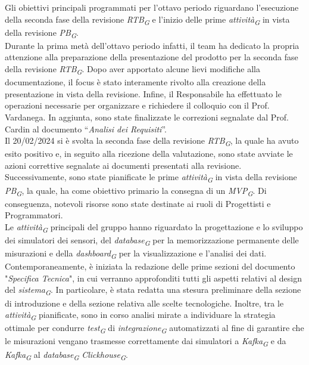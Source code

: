 Gli obiettivi principali programmati per l’ottavo periodo riguardano l’esecuzione della seconda fase della revisione \textit{RTB}\textsubscript{\textit{G}} e l’inizio delle prime \textit{attività}\textsubscript{\textit{G}} in vista della revisione \textit{PB}\textsubscript{\textit{G}}. \\
Durante la prima metà dell’ottavo periodo infatti, il team ha dedicato la propria attenzione alla preparazione della presentazione del prodotto per la seconda fase della revisione \textit{RTB}\textsubscript{\textit{G}}. Dopo aver apportato alcune lievi modifiche alla documentazione, il focus è stato interamente rivolto alla creazione della presentazione in vista della revisione. Infine, il Responsabile ha effettuato le operazioni necessarie per organizzare e richiedere il colloquio con il Prof. Vardanega. In aggiunta, sono state finalizzate le correzioni segnalate dal Prof. Cardin al documento “\textit{Analisi dei Requisiti}”. \\
Il 20/02/2024 si è svolta la seconda fase della revisione \textit{RTB}\textsubscript{\textit{G}}, la quale ha avuto esito positivo e, in seguito alla ricezione della valutazione, sono state avviate le azioni correttive segnalate ai documenti presentati alla revisione. \\
Successivamente, sono state pianificate le prime \textit{attività}\textsubscript{\textit{G}} in vista della revisione \textit{PB}\textsubscript{\textit{G}}, la quale, ha come obiettivo primario la consegna di un \textit{MVP}\textsubscript{\textit{G}}. Di conseguenza, notevoli risorse sono state destinate ai ruoli di Progettisti e Programmatori. \\
Le \textit{attività}\textsubscript{\textit{G}} principali del gruppo hanno riguardato la progettazione e lo sviluppo dei simulatori dei sensori, del \textit{database}\textsubscript{\textit{G}} per la memorizzazione permanente delle misurazioni e della \textit{dashboard}\textsubscript{\textit{G}} per la visualizzazione e l’analisi dei dati.
Contemporaneamente, è iniziata la redazione delle prime sezioni del documento "\textit{Specifica Tecnica}", in cui verranno approfonditi tutti gli aspetti relativi al design del \textit{sistema}\textsubscript{\textit{G}}. In particolare, è stata redatta una stesura preliminare della sezione di introduzione e della sezione relativa alle scelte tecnologiche.
Inoltre, tra le \textit{attività}\textsubscript{\textit{G}} pianificate, sono in corso analisi mirate a individuare la strategia ottimale per condurre \textit{test}\textsubscript{\textit{G}} di \textit{integrazione}\textsubscript{\textit{G}} automatizzati al fine di garantire che le misurazioni vengano trasmesse correttamente dai simulatori a \textit{Kafka}\textsubscript{\textit{G}} e da \textit{Kafka}\textsubscript{\textit{G}} al \textit{database}\textsubscript{\textit{G}} \textit{Clickhouse}\textsubscript{\textit{G}}. \\
